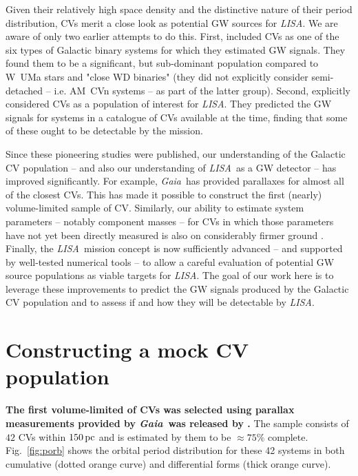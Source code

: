 \documentclass[fleqn,usenatbib]{mnras}
\newcommand{\lisa}{{\it LISA}}
\newcommand{\gaia}{{\it Gaia}}
\begin{document}
Given their relatively high space density and the distinctive nature of their period distribution, CVs merit a close look as potential GW sources for \lisa. We are aware of only two earlier attempts to do this. First, \cite{HBW90} included CVs as one of the six types of Galactic binary systems for which they estimated GW signals. They found them to be a significant, but sub-dominant population compared to W~UMa stars and "close WD binaries" (they did not explicitly consider semi-detached -- i.e. AM~CVn systems -- as part of the latter group). Second, \cite{MAA00} explicitly considered CVs as a population of interest for \lisa. They predicted the GW signals for systems in a catalogue of CVs available at the time, finding that some of these ought to be detectable by the mission. 

Since these pioneering studies were published, our understanding of the Galactic CV population -- and also our understanding of \lisa\ as a GW detector -- has improved significantly. For example, \gaia\ has provided parallaxes for almost all of the closest CVs. This has made it possible to construct the first (nearly) volume-limited sample of CV. Similarly, our ability to estimate system parameters -- notably component masses -- for CVs in which those parameters have not yet been directly measured is also on considerably firmer ground \citep{knigge06,knigge11,savoury11,carter13}. Finally, the \lisa\ mission concept is now sufficiently advanced -- and supported by well-tested numerical tools -- to allow a careful evaluation of potential GW source populations as viable targets for \lisa \citep[e.g.][]{PhysRevD.107.063004,LEGWORK_joss,LEGWORK_apjs}. The goal of our work here is to leverage these improvements to predict the GW signals produced by the Galactic CV population and to assess if and how they will be detectable by \lisa.


\section{Constructing a mock CV population}\label{sec:mock_CV}

\textbf{The first volume-limited of CVs was selected using parallax measurements provided by \gaia\ was released by \cite{pala20}.} The sample consists of $42$ CVs within $150\,\rm{pc}$ and is estimated by them to be $\approx 75\%$ complete. Fig.~\ref{fig:porb} shows the orbital period distribution for these 42 systems in both cumulative (dotted orange curve) and differential forms (thick orange curve).
\end{document}
